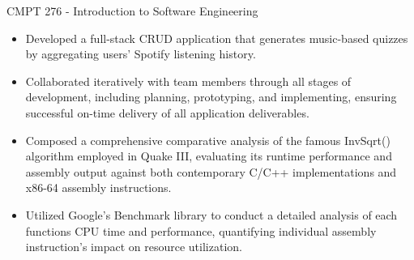 \documentclass[10pt,a4paper,ragged2e,withhyper]{altacv}
\begin{document}
\begin{paracol}{2}
        \vspace{-2em}
             {CMPT 276 - Introduction to \medskip Software Engineering}
            \vspace{-0.5em}
            \begin{itemize}
            \item Developed a full-stack CRUD application that generates music-based quizzes by aggregating users’ Spotify listening history.
            \item Collaborated iteratively with team members through all stages of development, including planning, prototyping, and implementing, ensuring successful on-time delivery of all application deliverables.
            \end{itemize}
            \vspace{-0.5em}
            \divider
            \vspace{0.5em}
            \vspace{-0.5em}
            \begin{itemize}
            \item Composed a comprehensive comparative analysis of the famous InvSqrt() algorithm employed in Quake III, evaluating its runtime performance and assembly output against both contemporary C/C++ implementations and x86-64 assembly instructions.
            \item Utilized Google's Benchmark library to conduct a detailed analysis of each functions CPU time and performance, quantifying individual assembly instruction's impact on resource utilization.
            \end{itemize}
            \vspace{-0.5em}
            \divider
            \vspace{0.5em}
            \vspace{-0.5em}
            \begin{itemize}

\end{itemize}
\end{paracol}
\end{document}
